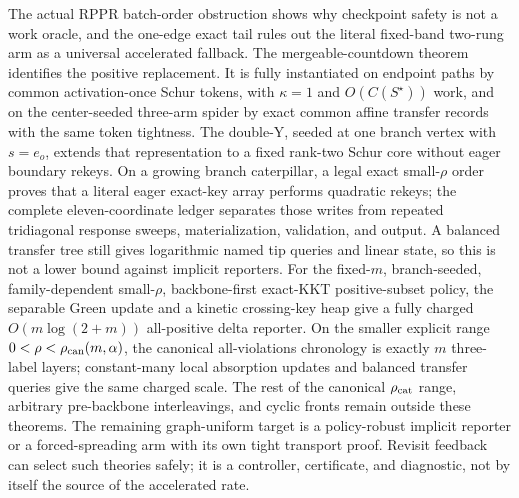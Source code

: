 The actual RPPR batch-order obstruction shows why checkpoint safety is not a
work oracle, and the one-edge exact tail rules out the literal fixed-band
two-rung arm as a universal accelerated fallback.  The mergeable-countdown
theorem identifies the positive replacement.  It is fully instantiated on
endpoint paths by common activation-once Schur tokens, with $\kappa=1$ and
$O(C(S^\star))$ work, and on the center-seeded three-arm spider by exact
common affine transfer records with the same token tightness.  The double-Y,
seeded at one branch vertex with $s=e_o$, extends that representation to a
fixed rank-two Schur core without eager
boundary rekeys.  On a growing branch caterpillar, a legal exact small-$\rho$
order proves that a literal eager exact-key array performs quadratic rekeys;
the complete eleven-coordinate ledger separates those writes from repeated
tridiagonal response sweeps, materialization, validation, and output.  A
balanced transfer tree still gives logarithmic named tip queries and linear
state, so this is not a lower bound against implicit reporters.  For the
fixed-$m$, branch-seeded, family-dependent small-$\rho$, backbone-first exact-KKT
positive-subset policy, the separable Green update and a kinetic crossing-key
heap give a fully charged $O(m\log(2+m))$
all-positive delta reporter.  On the smaller explicit range
$0<\rho<\rho_{\rm can}(m,\alpha)$, the canonical all-violations chronology is
exactly $m$ three-label layers; constant-many local absorption updates and
balanced transfer queries give the same charged scale.  The rest of the
canonical $\rho_{\rm cat}$ range, arbitrary pre-backbone interleavings, and
cyclic fronts remain outside these theorems.
The remaining graph-uniform target is a policy-robust implicit reporter or a
forced-spreading arm with its own tight transport proof.  Revisit
feedback can select such theories safely; it is a controller, certificate,
and diagnostic, not by itself the source of the accelerated rate.




